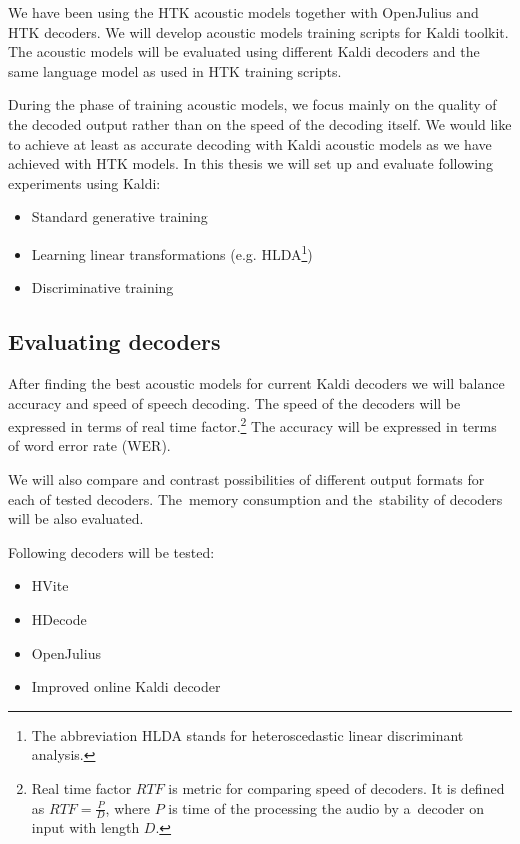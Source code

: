 We have been using the HTK acoustic models together with OpenJulius and HTK decoders. We will develop acoustic models training scripts for Kaldi toolkit. The acoustic models will be evaluated using different Kaldi decoders and the same language model as used in HTK training scripts. 

During the phase of training acoustic models, we focus mainly on the quality of the decoded output rather than on the speed of the decoding itself. We would like to achieve at least as accurate decoding with Kaldi acoustic models as we have achieved with HTK models. In this thesis we will set up and evaluate following experiments using Kaldi:
\begin{itemize}
    \item Standard generative training
    \item Learning linear transformations (e.g. HLDA\footnote{The abbreviation HLDA stands for heteroscedastic linear discriminant analysis.})
    \item Discriminative training 
\end{itemize}
 

\subsection{Evaluating decoders} 
\label{sub:compare_rt}
After finding the best acoustic models for current Kaldi decoders we will balance accuracy and speed of speech decoding.
The speed of the decoders will be expressed in terms of real time factor.\footnote{Real time factor $RTF$ is metric for comparing speed of decoders. It is defined as $RTF = \frac{P}{D}$, where $P$ is time of the processing the audio by a~decoder on input with length $D$.} The accuracy will be expressed in terms of word error rate (WER).

We will also compare and contrast possibilities of different output formats for each of tested decoders. The~memory consumption and the~stability of decoders will be also evaluated. 

Following decoders will be tested:
\begin{itemize}
    \item HVite
    \item HDecode
    \item OpenJulius
    \item Improved online Kaldi decoder
\end{itemize}


